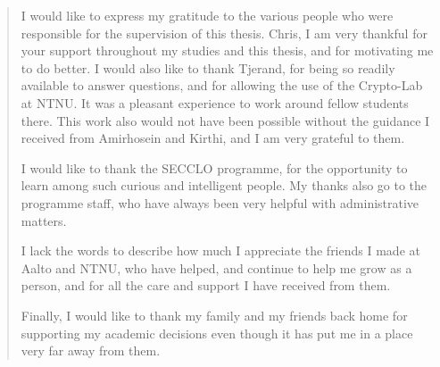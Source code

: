 \renewcommand{\abstractname}{Acknowledgements}
\begin{abstract}
\noindent 
I would like to express my gratitude to the various people who were responsible for the supervision of this thesis. Chris, I am very thankful for your support throughout my studies and this thesis, and for motivating me to do better. I would also like to thank Tjerand, for being so readily available to answer questions, and for allowing the use of the Crypto-Lab at NTNU. It was a pleasant experience to work around fellow students there. This work also would not have been possible without the guidance I received from Amirhosein and Kirthi, and I am very grateful to them. 

I would like to thank the {SECCLO} programme, for the opportunity to learn among such curious and intelligent people. My thanks also go to the programme staff, who have always been very helpful with administrative matters.

I lack the words to describe how much I appreciate the friends I made at Aalto and NTNU, who have helped, and continue to help me grow as a person, and for all the care and support I have received from them.

Finally, I would like to thank my family and my friends back home for supporting my academic decisions even though it has put me in a place very far away from them. 

\end{abstract}
\cleardoublepage